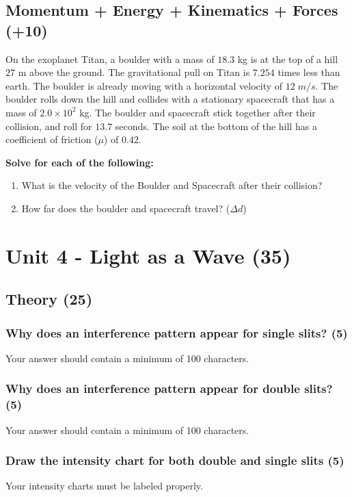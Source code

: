 \documentclass{article}
\begin{document}
\subsection{Momentum + Energy + Kinematics + Forces (+10)}
On the exoplanet Titan, a boulder with a mass of $18.3$ kg is at the top of a hill $27$ m above the ground.
The gravitational pull on Titan is $7.254$ times less than earth. The boulder is already moving with
a horizontal velocity of $12\;m/s$. The boulder rolls down the hill and collides with a stationary
spacecraft that has a mass of $2.0\times 10^2$ kg. The boulder and spacecraft stick together after their
collision, and roll for $13.7$ seconds. The soil at the bottom of the hill has a coefficient of
friction ($\mu$) of $0.42$.

\vspace{10pt}

\noindent\textbf{Solve for each of the following:}
\begin{enumerate}[label=\alph*)]
    \item What is the velocity of the Boulder and Spacecraft after their collision?
    \item How far does the boulder and spacecraft travel? ($\Delta d$)
\end{enumerate}\leavevmode

\section{Unit 4 - Light as a Wave (35)}
\subsection{Theory (25)}
\subsubsection{Why does an interference pattern appear for single slits? (5)}
Your answer should contain a minimum of 100 characters.

\subsubsection{Why does an interference pattern appear for double slits? (5)}
Your answer should contain a minimum of 100 characters.

\subsubsection{Draw the intensity chart for both double and single slits (5)}
Your intensity charts must be labeled properly.
\end{document}
